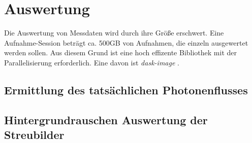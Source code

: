 \chapter{Auswertung}
\label{text:auswertung}
Die Auswertung von Messdaten wird durch ihre Größe erschwert. Eine Aufnahme-Session beträgt ca. 500GB von Aufnahmen, die einzeln ausgewertet werden sollen. Aus diesem Grund ist eine hoch effizente Bibliothek mit der Parallelisierung erforderlich. Eine davon ist \textit{dask-image} \cite{dask-library}.

\section{Ermittlung des tatsächlichen Photonenflusses}
\label{text:butterfly_counting}


\section{Hintergrundrauschen Auswertung der Streubilder}
\label{text:streuung_counting}